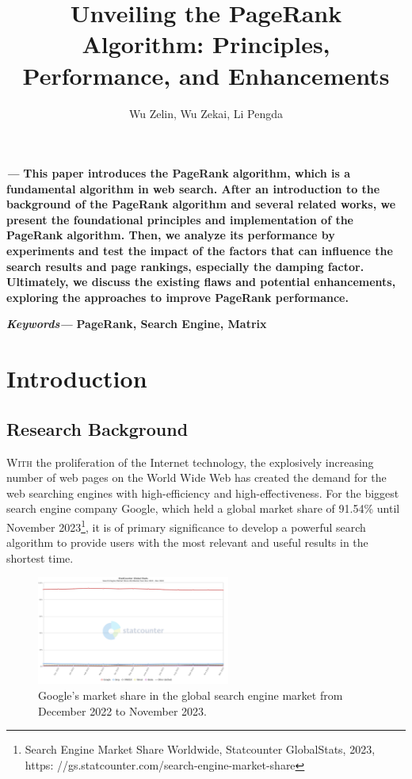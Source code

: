 \documentclass[lettersize,journal,12pt,conference]{IEEEtran}
\renewenvironment{abstract}
{\fontsize{12}{14}\textit{\textbf{\abstractname---}}\bfseries\ignorespaces}
{}
\renewenvironment{IEEEkeywords}
{\fontsize{12}{14}\textit{\textbf{Keywords---}}\bfseries\ignorespaces}{}
\begin{document}
\onehalfspacing
\title{Unveiling the PageRank Algorithm: Principles, Performance, and Enhancements}
\author{Wu Zelin, Wu Zekai, Li Pengda}

\maketitle\thispagestyle{headings}
%

\begin{abstract}
	This paper introduces the PageRank algorithm, which is a fundamental algorithm in web search. After an introduction to the background of the PageRank algorithm and several related works, we present the foundational principles and implementation of the PageRank algorithm. Then, we analyze its performance by experiments and test the impact of the factors that can influence the search results and page rankings, especially the damping factor. Ultimately, we discuss the existing flaws and potential enhancements, exploring the approaches to improve PageRank performance.
\end{abstract}

\begin{IEEEkeywords}
	PageRank, Search Engine, Matrix
\end{IEEEkeywords}


\section{Introduction}

\subsection{Research Background}

\lettrine{W}{ith} 
the proliferation of the Internet technology, the explosively increasing number of web pages on the World Wide Web has created the demand for the web searching engines with high-efficiency and high-effectiveness. 
For the biggest search engine company Google, which held a global market share of 91.54\% until November 2023\footnote[1]{Search Engine Market Share Worldwide, Statcounter GlobalStats, 2023, https:
	//gs.statcounter.com/search-engine-market-share}, it is of primary significance to develop a powerful search algorithm to provide users with the most relevant and useful results in the shortest time.

\begin{figure}[h]
	\centering
	\includegraphics[width=2.5in]{images/fig2.png}
	\caption{Google's market share in the global search engine market from December 2022 to November 2023.}
	\label{fig1}
\end{figure}
\end{document}

